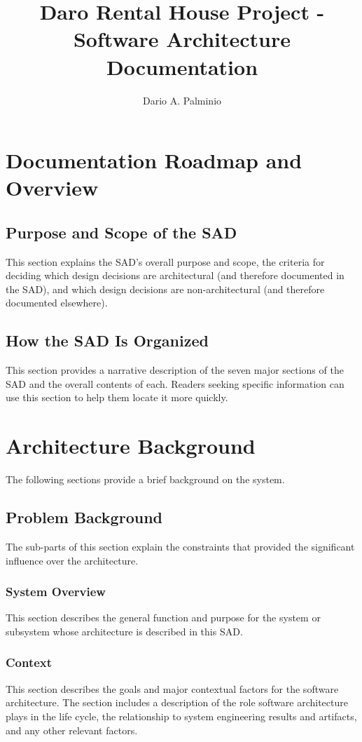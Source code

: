\documentclass[a4paper,11pt]{book}
\title{Daro Rental House Project - Software Architecture Documentation}
\author{Dario A. Palminio}
\begin{document}
\maketitle

\tableofcontents

\chapter{Documentation Roadmap and Overview}

\section{Purpose and Scope of the SAD}
This section explains the SAD’s overall purpose and scope, the criteria for deciding which design decisions are architectural (and therefore documented in the SAD), and which design decisions are non-architectural (and therefore documented elsewhere).

\section{How the SAD Is Organized}
This section provides a narrative description of the seven major sections of the SAD and the overall contents of each. Readers seeking specific information can use this section to help them locate it more quickly.

\chapter{Architecture Background}
The following sections provide a brief background on the system.

\section{Problem Background}
The sub-parts of this section explain the constraints that provided the significant influence over the architecture.

\subsection{System Overview}
This section describes the general function and purpose for the system or subsystem whose architecture is described in this SAD.

\subsection{Context}
This section describes the goals and major contextual factors for the software architecture. The section includes a description of the role software architecture plays in the life cycle, the relationship to system engineering results and artifacts, and any other relevant factors.
\end{document}
